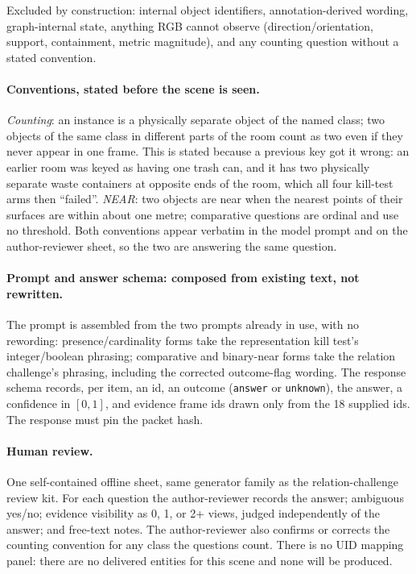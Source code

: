 Excluded by construction: internal object identifiers, annotation-derived
wording, graph-internal state, anything RGB cannot observe
(direction/orientation, support, containment, metric magnitude), and any
counting question without a stated convention.

\paragraph{Conventions, stated before the scene is seen.}
\emph{Counting}: an instance is a physically separate object of the named
class; two objects of the same class in different parts of the room count as
two even if they never appear in one frame. This is stated because a
previous key got it wrong: an earlier room was keyed as having one trash
can, and it has two physically separate waste containers at opposite ends of
the room, which all four kill-test arms then ``failed''. \emph{NEAR}: two objects are
near when the nearest points of their surfaces are within about one metre;
comparative questions are ordinal and use no threshold. Both conventions
appear verbatim in the model prompt and on the author-reviewer sheet, so the two are
answering the same question.

\paragraph{Prompt and answer schema: composed from existing text, not
rewritten.} The prompt is assembled from the two prompts already in use,
with no rewording: presence/cardinality forms take the representation kill
test's integer/boolean phrasing; comparative and binary-near forms take the
relation challenge's phrasing, including the corrected outcome-flag wording.
The response schema records, per item, an id, an outcome (\texttt{answer} or
\texttt{unknown}), the answer, a confidence in $[0,1]$, and evidence frame
ids drawn only from the 18 supplied ids. The response must pin the packet
hash.

\paragraph{Human review.} One self-contained offline sheet, same generator
family as the relation-challenge review kit. For each question the author-reviewer
records the answer; ambiguous yes/no; evidence visibility as 0, 1, or 2+
views, judged independently of the answer; and free-text notes. The author-reviewer
also confirms or corrects the counting convention for any class the
questions count. There is no UID mapping panel: there are no delivered
entities for this scene and none will be produced.

